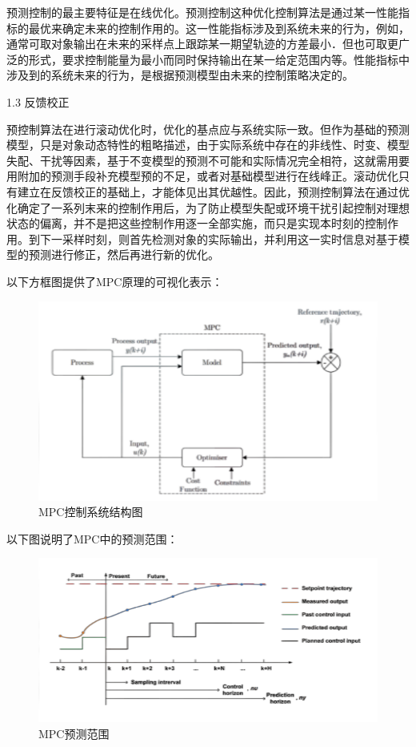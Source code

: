 预测控制的最主要特征是在线优化。预测控制这种优化控制算法是通过某一性能指标的最优来确定未来的控制作用的。这一性能指标涉及到系统未来的行为，例如，通常可取对象输出在未来的采样点上跟踪某一期望轨迹的方差最小．但也可取更广泛的形式，要求控制能量为最小而同时保持输出在某一给定范围内等。性能指标中涉及到的系统未来的行为，是根据预测模型由未来的控制策略决定的。

1.3 反馈校正

预控制算法在进行滚动优化时，优化的基点应与系统实际一致。但作为基础的预测模型，只是对象动态特性的粗略描述，由于实际系统中存在的非线性、时变、模型失配、干扰等因素，基于不变模型的预测不可能和实际情况完全相符，这就需用要用附加的预测手段补充模型预的不足，或者对基础模型进行在线峰正。滚动优化只有建立在反馈校正的基础上，才能体见出其优越性。因此，预测控制算法在通过优化确定了一系列末来的控制作用后，为了防止模型失配或环境干扰引起控制对理想状态的偏离，并不是把这些控制作用逐一全部实施，而只是实现本时刻的控制作用。到下一采样时刻，则首先检测对象的实际输出，并利用这一实时信息对基于模型的预测进行修正，然后再进行新的优化。

以下方框图提供了MPC原理的可视化表示：

\begin{figure}[ht]
  \centering
  \includegraphics[width=0.8\linewidth]{./Figure/MPC-Control.png}
  \caption{MPC控制系统结构图}\label{Fig:xd1}
\end{figure}

以下图说明了MPC中的预测范围：

\begin{figure}[ht]
  \centering
  \includegraphics[width=0.8\linewidth]{./Figure/MPC-Prediction.png}
  \caption{MPC预测范围}\label{Fig:xd1}
\end{figure}

